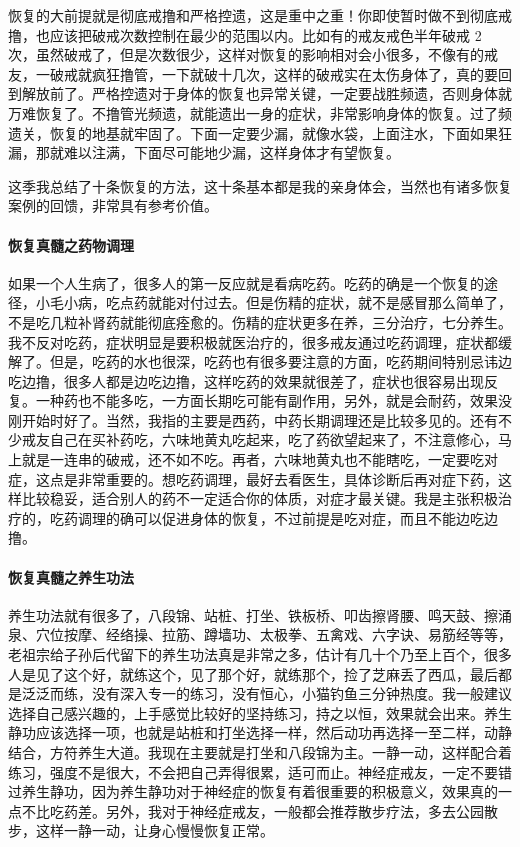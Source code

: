 \documentclass{ctexart}
\begin{document}
恢复的大前提就是彻底戒撸和严格控遗，这是重中之重！你即使暂时做不到彻底戒撸，也应该把破戒次数控制在最少的范围以内。比如有的戒友戒色半年破戒 2 次，虽然破戒了，但是次数很少，这样对恢复的影响相对会小很多，不像有的戒友，一破戒就疯狂撸管，一下就破十几次，这样的破戒实在太伤身体了，真的要回到解放前了。严格控遗对于身体的恢复也异常关键，一定要战胜频遗，否则身体就万难恢复了。不撸管光频遗，就能遗出一身的症状，非常影响身体的恢复。过了频遗关，恢复的地基就牢固了。下面一定要少漏，就像水袋，上面注水，下面如果狂漏，那就难以注满，下面尽可能地少漏，这样身体才有望恢复。

这季我总结了十条恢复的方法，这十条基本都是我的亲身体会，当然也有诸多恢复案例的回馈，非常具有参考价值。

\paragraph{恢复真髓之药物调理}

如果一个人生病了，很多人的第一反应就是看病吃药。吃药的确是一个恢复的途径，小毛小病，吃点药就能对付过去。但是伤精的症状，就不是感冒那么简单了，不是吃几粒补肾药就能彻底痊愈的。伤精的症状更多在养，三分治疗，七分养生。我不反对吃药，症状明显是要积极就医治疗的，很多戒友通过吃药调理，症状都缓解了。但是，吃药的水也很深，吃药也有很多要注意的方面，吃药期间特别忌讳边吃边撸，很多人都是边吃边撸，这样吃药的效果就很差了，症状也很容易出现反复。一种药也不能多吃，一方面长期吃可能有副作用，另外，就是会耐药，效果没刚开始时好了。当然，我指的主要是西药，中药长期调理还是比较多见的。还有不少戒友自己在买补药吃，六味地黄丸吃起来，吃了药欲望起来了，不注意修心，马上就是一连串的破戒，还不如不吃。再者，六味地黄丸也不能瞎吃，一定要吃对症，这点是非常重要的。想吃药调理，最好去看医生，具体诊断后再对症下药，这样比较稳妥，适合别人的药不一定适合你的体质，对症才最关键。我是主张积极治疗的，吃药调理的确可以促进身体的恢复，不过前提是吃对症，而且不能边吃边撸。

\paragraph{恢复真髓之养生功法}

养生功法就有很多了，八段锦、站桩、打坐、铁板桥、叩齿擦肾腰、鸣天鼓、擦涌泉、穴位按摩、经络操、拉筋、蹲墙功、太极拳、五禽戏、六字诀、易筋经等等，老祖宗给子孙后代留下的养生功法真是非常之多，估计有几十个乃至上百个，很多人是见了这个好，就练这个，见了那个好，就练那个，捡了芝麻丢了西瓜，最后都是泛泛而练，没有深入专一的练习，没有恒心，小猫钓鱼三分钟热度。我一般建议选择自己感兴趣的，上手感觉比较好的坚持练习，持之以恒，效果就会出来。养生静功应该选择一项，也就是站桩和打坐选择一样，然后动功再选择一至二样，动静结合，方符养生大道。我现在主要就是打坐和八段锦为主。一静一动，这样配合着练习，强度不是很大，不会把自己弄得很累，适可而止。神经症戒友，一定不要错过养生静功，因为养生静功对于神经症的恢复有着很重要的积极意义，效果真的一点不比吃药差。另外，我对于神经症戒友，一般都会推荐散步疗法，多去公园散步，这样一静一动，让身心慢慢恢复正常。
\end{document}
